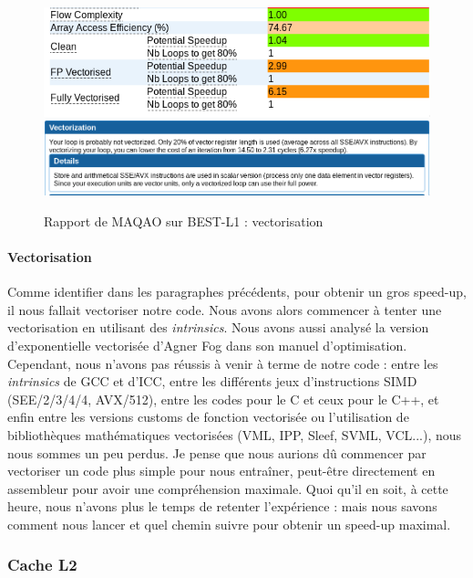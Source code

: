 \documentclass[12pt,a4paper]{article}
\begin{document}
\begin{figure}[h]
    \centering
    \includegraphics[scale=0.6]{figures/L1/maqao_bestl1_wflags.png}
    \includegraphics[scale=0.45]{figures/L1/maqao_bestl1_wflags_vec.png}
    \caption{Rapport de MAQAO sur BEST-L1 : vectorisation}
    \label{fig.maqao_bestl1_vec}
\end{figure}

\paragraph{Vectorisation} Comme identifier dans les paragraphes précédents, pour
obtenir un gros speed-up, il nous fallait vectoriser notre code. Nous avons
alors commencer à tenter une vectorisation en utilisant des \textit{intrinsics}.
Nous avons aussi analysé la version d'exponentielle vectorisée d'Agner Fog dans
son manuel d'optimisation. Cependant, nous n'avons pas réussis à venir à terme
de notre code : entre les \textit{intrinsics} de GCC et d'ICC, entre les
différents jeux d'instructions SIMD (SEE/2/3/4/4, AVX/512), entre les codes
pour le C et ceux pour le C++, et enfin entre les versions customs de fonction
vectorisée ou l'utilisation de bibliothèques mathématiques vectorisées (VML, IPP,
Sleef, SVML, VCL...), nous nous sommes un peu perdus. Je pense que nous aurions
dû commencer par vectoriser un code plus simple pour nous entraîner, peut-être
directement en assembleur pour avoir une compréhension maximale. Quoi qu'il en
soit, à cette heure, nous n'avons plus le temps de retenter l'expérience : mais
nous savons comment nous lancer et quel chemin suivre pour obtenir un speed-up
maximal.

\subsubsection{Cache L2}
\end{document}
